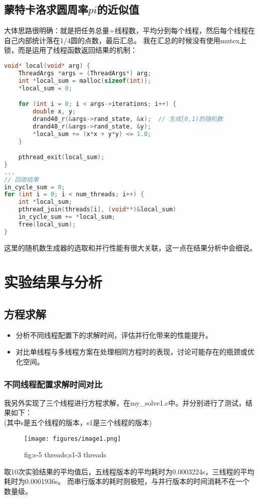 \documentclass{SYSUReport}
\begin{document}
\subsection{蒙特卡洛求圆周率$pi$的近似值}
大体思路很明确：就是把任务总量÷线程数，平均分到每个线程，然后每个线程在自己内部统计落在1/4圆的点数，最后汇总。
我在汇总的时候没有使用mutex上锁，而是运用了线程函数返回结果的机制：
\begin{lstlisting}[language=c]
void* local(void* arg) {
    ThreadArgs *args = (ThreadArgs*) arg;
    int *local_sum = malloc(sizeof(int));
    *local_sum = 0;

    for (int i = 0; i < args->iterations; i++) {
        double x, y;
        drand48_r(&args->rand_state, &x);  // 生成[0,1)的随机数
        drand48_r(&args->rand_state, &y);
        *local_sum += (x*x + y*y) <= 1.0;
    }

    pthread_exit(local_sum);
}
...
// 回收结果
in_cycle_sum = 0;
for (int i = 0; i < num_threads; i++) {
    int *local_sum;
    pthread_join(threads[i], (void**)&local_sum)
    in_cycle_sum += *local_sum;
    free(local_sum);
}
\end{lstlisting}
这里的随机数生成器的选取和并行性能有很大关联，这一点在结果分析中会细说。
\section{实验结果与分析}
\subsection{方程求解}
\begin{itemize}
    \item 分析不同线程配置下的求解时间，评估并行化带来的性能提升。
    \item 对比单线程与多线程方案在处理相同方程时的表现，讨论可能存在的瓶颈或优化空间。
\end{itemize}
\subsubsection{不同线程配置求解时间对比}
我另外实现了三个线程进行方程求解，在my\_solve1.c中。并分别进行了测试，结果如下：\\
(其中s是五个线程的版本，s1是三个线程的版本)\\
\begin{figure}[htbp]
    \centering          %
    \texttt{[image: figures/image1.png]} %
    \caption{fig:s-5 threads;s1-3 threads}  %
    \label{fig:s-5 threads；s1-3 threads} %
\end{figure}
取10次实验结果的平均值后，五线程版本的平均耗时为0.0003224s，三线程的平均耗时为0.0001936s。
而串行版本的耗时则极短，与并行版本的时间消耗不在一个数量级。
\end{document}
